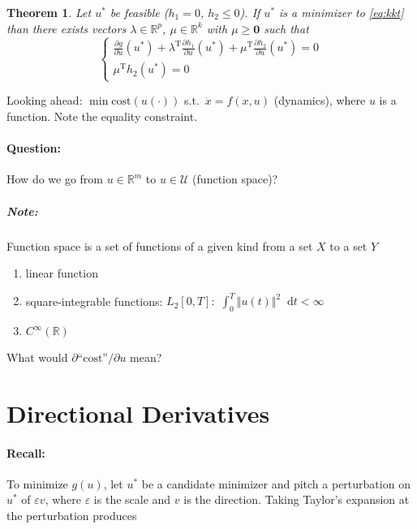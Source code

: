 \documentclass[letterpaper,12pt,titlepage]{report}
\newcommand*\dif{\mathop{}\!\mathrm{d}}
\newcommand{\trans}{^\text{T}}
\newcommand*\pder[2]{\frac{\partial #1}{\partial #2}}
\newcommand*\R{\mathbb{R}}
\theoremstyle{plain}
\newtheorem*{thm}{Theorem}
\theoremstyle{definition}
\begin{document}
\begin{thm}
  Let $u^*$ be feasible ($h_1=0$, $h_2\le0$). If $u^*$ is a minimizer to \eqref{eq:kkt} than there exists vectors $\lambda\in\R^p$, $\mu\in\R^k$ with $\mu\ge\bm 0$ such that
  \[ \begin{cases}
      \displaystyle \pder{g}{u}(u^*) + \lambda\trans \pder{h_1}{u}(u^*) + \mu\trans \pder{h_2}{u}(u^*) = 0 \\[1ex]
      \mu\trans h_2(u^*) = 0
    \end{cases} \]
\end{thm}

Looking ahead: $\min \text{cost}(u(\cdot))$ s.t.\ $\dot x = f(x,u)$ (dynamics), where $u$ is a function. Note the equality constraint.

\paragraph{Question:} How do we go from $u\in\R^m$ to $u\in\mathcal U$ (function space)?
\subparagraph{Note:} Function space is a set of functions of a given kind from a set $X$ to a set $Y$
\begin{enumerate}
\item linear function
\item square-integrable functions: $L_2[0,T]:$ $\int_0^T \Vert u(t)\Vert^2 \dif t < \infty$
\item $C^\infty (\R)$
\end{enumerate}
What would $\partial \text{``cost''}/\partial u$ mean?

\section{Directional Derivatives}
\paragraph{Recall:} To minimize $g(u)$, let $u^*$ be a candidate minimizer and pitch a perturbation on $u^*$ of $\varepsilon v$, where $\varepsilon$ is the scale and $v$ is the direction. Taking Taylor's expansion at the perturbation produces

\begin{center}
\end{center}
\end{document}
